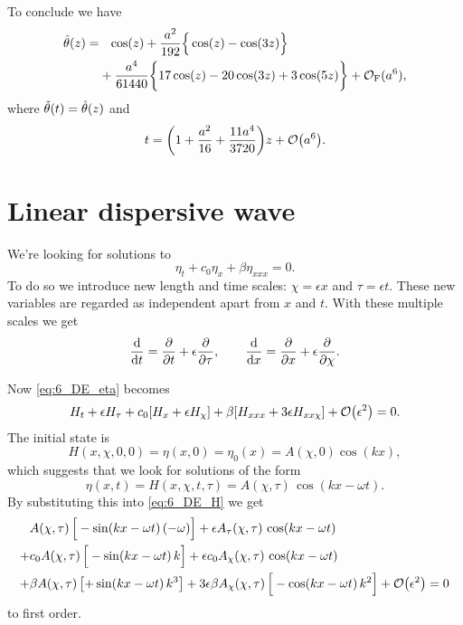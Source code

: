 \documentclass[11pt,letter, swedish, english
]{article}
\renewcommand{\thesubsection}{\arabic{section} (\alph{subsection})}
\begin{document}
To conclude we have
\begin{equation}
\begin{aligned}
\hat{\theta}(z)=&\phantom{+}\cos(z)
+\frac{a^2}{192}\Big\{\cos(z)-\cos(3z) \Big\}\\
&+\frac{a^4}{61440}
\bigg\{
17\cos(z)-20\cos(3z)+3\cos(5z)
\bigg\}
 + \mathcal{O}_\text{F}(a^6),
\end{aligned}
\end{equation}
where $\tilde{\theta}(t)=\hat{\theta}(z)$ and
\begin{equation}
t=\qty(1+\frac{a^2}{16}+\frac{11a^4}{3720})z+\order{a^6}.
\end{equation}

\section{Linear dispersive wave}
\renewcommand{\thesubsection}{\arabic{section} (\alph{subsection})}
We're looking for solutions to 
\begin{equation}\label{eq:6_DE_eta}
\eta_t + c_0\eta_{x}+\beta\eta_{xxx}=0.
\end{equation}
To do so we introduce new length and time scales: $\chi=\epsilon x$ and
$\tau=\epsilon t$. These new variables are regarded as independent
apart from $x$ and $t$. 
With these multiple scales we get
\begin{equation}
\dv{t}=\pdv{t}+\epsilon\pdv{\tau}\qcomma\quad
\dv{x}=\pdv{x}+\epsilon\pdv{\chi}.
\end{equation}


Now \eqref{eq:6_DE_eta} becomes
\begin{equation}\label{eq:6_DE_H}
H_t+\epsilon H_\tau +c_0\qty[H_x+\epsilon H_\chi]
+\beta\qty[H_{xxx} + 3\epsilon H_{xx\chi}] +\order{\epsilon^2}=0.
\end{equation}
The initial state is
\begin{equation}
H(x,\chi, 0, 0)=\eta(x, 0)=\eta_0(x)=A(\chi, 0)\cos(kx),
\end{equation}
which suggests that we look for solutions of the form
\begin{equation}
\eta(x, t)=H(x,\chi, t,\tau)=A(\chi, \tau)\,\cos(kx-\omega t).
\end{equation}
By substituting this into \eqref{eq:6_DE_H} we get
\begin{equation}
\begin{aligned}
&A(\chi,\tau)\,\Big[-\sin(kx-\omega{t})\,(-\omega)\Big]
+\epsilon A_\tau(\chi,\tau)\,\cos(kx-\omega{t})\\
+&c_0A(\chi,\tau)\,\Big[-\sin(kx-\omega{t})\,k\Big]
+\epsilon c_0 A_\chi(\chi,\tau)\,\cos(kx-\omega{t})\\
+&\beta A(\chi,\tau)\,\qty[+\sin(kx-\omega{t})\,k^3]
+3\epsilon\beta A_\chi(\chi,\tau)\,
\Big[-\cos(kx-\omega{t})\,k^2\Big]
+\order{\epsilon^2}=0
\end{aligned}
\end{equation}
to first order.
\end{document}
